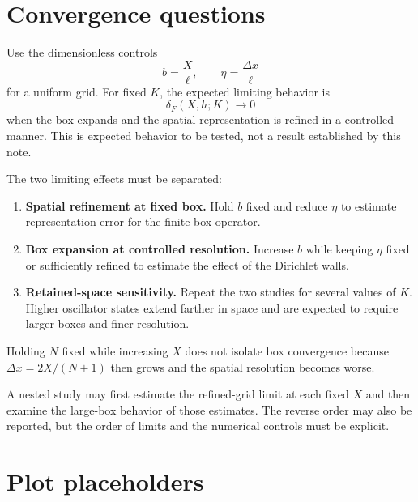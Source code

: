\section*{Convergence questions}

Use the dimensionless controls
\begin{equation}
    b=\frac{X}{\ell},
    \qquad
    \eta=\frac{\Delta x}{\ell}
\end{equation}
for a uniform grid. For fixed $K$, the expected limiting behavior is
\begin{equation}
    \delta_F(X,h;K)
    \longrightarrow
    0
\end{equation}
when the box expands and the spatial representation is refined in a controlled
manner. This is expected behavior to be tested, not a result established by
this note.

The two limiting effects must be separated:
\begin{enumerate}
    \item \textbf{Spatial refinement at fixed box.} Hold $b$ fixed and reduce
          $\eta$ to estimate representation error for the finite-box operator.
    \item \textbf{Box expansion at controlled resolution.} Increase $b$ while
          keeping $\eta$ fixed or sufficiently refined to estimate the effect
          of the Dirichlet walls.
    \item \textbf{Retained-space sensitivity.} Repeat the two studies for
          several values of $K$. Higher oscillator states extend farther in
          space and are expected to require larger boxes and finer resolution.
\end{enumerate}
Holding $N$ fixed while increasing $X$ does not isolate box convergence because
$\Delta x=2X/(N+1)$ then grows and the spatial resolution becomes worse.

A nested study may first estimate the refined-grid limit at each fixed $X$ and
then examine the large-box behavior of those estimates. The reverse order may
also be reported, but the order of limits and the numerical controls must be
explicit.

\section*{Plot placeholders}

